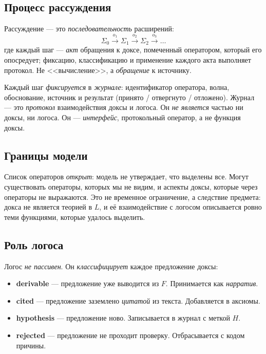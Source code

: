 \documentclass[12pt,a4paper]{article}
\begin{document}
\subsection{Процесс рассуждения}
\label{sec:process}

Рассуждение --- это \emph{последовательность} расширений:
\[
	\Sigma_0 \xrightarrow{o_1} \Sigma_1 \xrightarrow{o_2} \Sigma_2 \xrightarrow{o_3} \dots
\]
где каждый шаг --- \emph{акт} обращения к доксе, помеченный оператором,
который его опосредует; фиксацию, классификацию и применение каждого акта
выполняет протокол. Не <<вычисление>>, а \emph{обращение} к источнику.

Каждый шаг \emph{фиксируется} в \emph{журнале}: идентификатор оператора,
волна, обоснование, источник и результат (принято / отвергнуто / отложено).
Журнал --- это \emph{протокол} взаимодействия доксы и логоса. Он
\emph{не является} частью ни доксы, ни логоса. Он --- \emph{интерфейс},
протокольный оператор, а не функция доксы.

\subsection{Границы модели}
\label{sec:model_limits}

Список операторов \emph{открыт}: модель не утверждает, что выделены все.
Могут существовать операторы, которых мы не видим, и аспекты доксы, которые
через операторы не выражаются. Это не временное ограничение, а следствие
предмета: докса не является теорией в $L$, и её взаимодействие с логосом
описывается ровно теми функциями, которые удалось выделить.

\subsection{Роль логоса}
\label{sec:logos_role}

Логос \emph{не пассивен}. Он \emph{классифицирует} каждое предложение доксы:

\begin{itemize}
	\item \textbf{derivable} --- предложение уже выводится из $F$. Принимается как \emph{нарратив}.
	\item \textbf{cited} --- предложение заземлено \emph{цитатой} из текста. Добавляется в аксиомы.
	\item \textbf{hypothesis} --- предложение ново. Записывается в журнал с меткой $H$.
	\item \textbf{rejected} --- предложение не проходит проверку. Отбрасывается с кодом причины.
\end{itemize}
\end{document}
